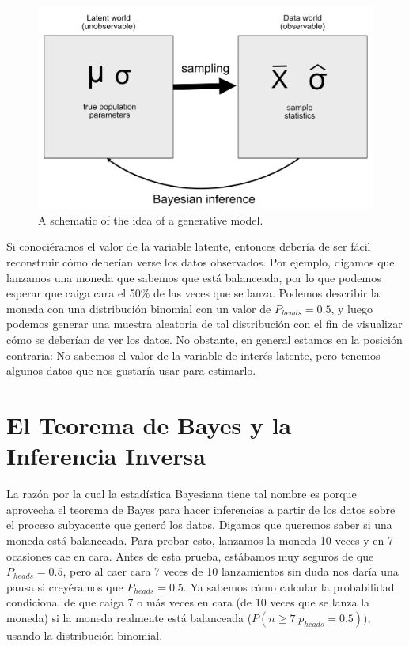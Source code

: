 \documentclass[
  12pt,
]{book}
\begin{document}
\begin{figure}
\includegraphics[width=0.8\linewidth]{images/BayesianInference} \caption{A schematic of the idea of a generative model.}\label{fig:GenerativeModel}
\end{figure}

Si conociéramos el valor de la variable latente, entonces debería de ser fácil reconstruir cómo deberían verse los datos observados. Por ejemplo, digamos que lanzamos una moneda que sabemos que está balanceada, por lo que podemos esperar que caiga cara el 50\% de las veces que se lanza. Podemos describir la moneda con una distribución binomial con un valor de \(P_{heads}=0.5\), y luego podemos generar una muestra aleatoria de tal distribución con el fin de visualizar cómo se deberían de ver los datos. No obstante, en general estamos en la posición contraria: No sabemos el valor de la variable de interés latente, pero tenemos algunos datos que nos gustaría usar para estimarlo.

\hypertarget{el-teorema-de-bayes-y-la-inferencia-inversa}{%
\section{El Teorema de Bayes y la Inferencia Inversa}\label{el-teorema-de-bayes-y-la-inferencia-inversa}}

La razón por la cual la estadística Bayesiana tiene tal nombre es porque aprovecha el teorema de Bayes para hacer inferencias a partir de los datos sobre el proceso subyacente que generó los datos. Digamos que queremos saber si una moneda está balanceada. Para probar esto, lanzamos la moneda 10 veces y en 7 ocasiones cae en cara. Antes de esta prueba, estábamos muy seguros de que \(P_{heads}=0.5\), pero al caer cara 7 veces de 10 lanzamientos sin duda nos daría una pausa si creyéramos que \(P_{heads}=0.5\). Ya sabemos cómo calcular la probabilidad condicional de que caiga 7 o más veces en cara (de 10 veces que se lanza la moneda) si la moneda realmente está balanceada (\(P(n\ge7|p_{heads}=0.5)\)), usando la distribución binomial.
\end{document}
